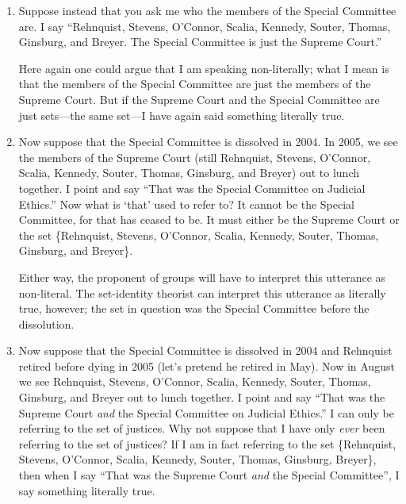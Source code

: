 \documentclass[11pt]{article}
\begin{document}
\begin{spacing}{1.5}
\begin{enumerate}
  \item Suppose instead that you ask me who the members of the Special
    Committee are.  I say ``Rehnquist, Stevens, O'Connor, Scalia,
    Kennedy, Souter, Thomas, Ginsburg, and Breyer.  The Special
    Committee is just the Supreme Court.''  

    Here again one could argue that I am speaking non-literally; what
    I mean is that the members of the Special Committee are just the
    members of the Supreme Court.  But if the Supreme Court and the
    Special Committee are just sets---the same set---I have again said
    something literally true.

  \item Now suppose that the Special Committee is dissolved in 2004.
    In 2005, we see the members of the Supreme Court (still Rehnquist,
    Stevens, O'Connor, Scalia, Kennedy, Souter, Thomas, Ginsburg, and
    Breyer) out to lunch together.  I point and say ``That was the
    Special Committee on Judicial Ethics.''  Now what is `that' used
    to refer to?  It cannot be the Special Committee, for that has
    ceased to be.  It must either be the Supreme Court or the set
    \{Rehnquist, Stevens, O'Connor, Scalia, Kennedy, Souter, Thomas,
    Ginsburg, and Breyer\}.

    Either way, the proponent of groups will have to interpret this
    utterance as non-literal.  The set-identity theorist can interpret
    this utterance as literally true, however; the set in question was
    the Special Committee before the dissolution.

  \item Now suppose that the Special Committee is dissolved in 2004
    and Rehnquist retired before dying in 2005 (let's pretend he
    retired in May).  Now in August we see Rehnquist, Stevens,
    O'Connor, Scalia, Kennedy, Souter, Thomas, Ginsburg, and Breyer
    out to lunch together.  I point and say ``That was the Supreme
    Court {\em and} the Special Committee on Judicial Ethics.''  I can
    only be referring to the set of justices.  Why not suppose that I
    have only {\em ever} been referring to the set of justices?  If I
    am in fact referring to the set \{Rehnquist, Stevens, O'Connor,
    Scalia, Kennedy, Souter, Thomas, Ginsburg, Breyer\}, then when I
    say ``That was the Supreme Court {\em and} the Special
    Committee'', I say something literally true.
\end{enumerate}


\end{spacing}
\end{document}
